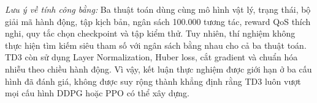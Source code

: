 \noindent\textit{Lưu ý về tính công bằng:} Ba thuật toán dùng cùng mô hình vật lý, trạng thái, bộ giải mã hành động, tập kịch bản, ngân sách 100.000 tương tác, reward QoS thích nghi, quy tắc chọn checkpoint và tập kiểm thử. Tuy nhiên, thí nghiệm không thực hiện tìm kiếm siêu tham số với ngân sách bằng nhau cho cả ba thuật toán. TD3 còn sử dụng Layer Normalization, Huber loss, cắt gradient và chuẩn hóa nhiễu theo chiều hành động. Vì vậy, kết luận thực nghiệm được giới hạn ở ba cấu hình đã đánh giá, không được suy rộng thành khẳng định rằng TD3 luôn vượt mọi cấu hình DDPG hoặc PPO có thể xây dựng.
